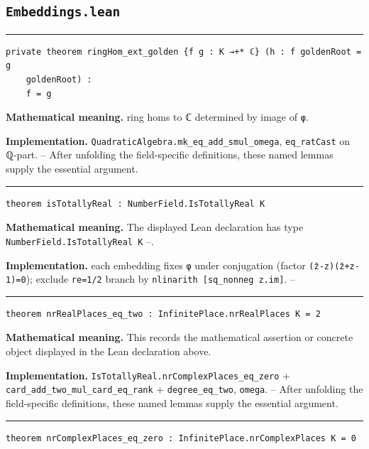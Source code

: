 \documentclass[UTF8,a4paper,11pt,fontset=fandol]{ctexart}
\theoremstyle{definition}
\newcommand{\statementsep}{\par\medskip\hrule\medskip}
\begin{document}
\subsection{\texttt{Embeddings.lean}}

\statementsep
\begin{verbatim}
private theorem ringHom_ext_golden {f g : K →+* ℂ} (h : f goldenRoot = g
    goldenRoot) :
    f = g
\end{verbatim}
\noindent\textbf{Mathematical meaning.} ring homs to ℂ determined by image of \texttt{φ}.\par
\noindent\textbf{Implementation.} \texttt{QuadraticAlgebra.\allowbreak{}mk\_\allowbreak{}eq\_\allowbreak{}add\_\allowbreak{}smul\_\allowbreak{}omega}, \texttt{eq\_\allowbreak{}ratCast} on ℚ-part. -- After unfolding the field-specific definitions, these named lemmas supply the essential argument.\par
\statementsep
\begin{verbatim}
theorem isTotallyReal : NumberField.IsTotallyReal K
\end{verbatim}
\noindent\textbf{Mathematical meaning.} The displayed Lean declaration has type \texttt{NumberField.\allowbreak{}IsTotallyReal K} --.\par
\noindent\textbf{Implementation.} each embedding fixes \texttt{φ} under conjugation (factor \texttt{(z̄-z)(z̄+z-1)=0}); exclude \texttt{re=1/\allowbreak{}2} branch by \texttt{nlinarith [sq\_\allowbreak{}nonneg z.\allowbreak{}im]}. --\par
\statementsep
\begin{verbatim}
theorem nrRealPlaces_eq_two : InfinitePlace.nrRealPlaces K = 2
\end{verbatim}
\noindent\textbf{Mathematical meaning.} This records the mathematical assertion or concrete object displayed in the Lean declaration above.\par
\noindent\textbf{Implementation.} \texttt{IsTotallyReal.\allowbreak{}nrComplexPlaces\_\allowbreak{}eq\_\allowbreak{}zero} + \texttt{card\_\allowbreak{}add\_\allowbreak{}two\_\allowbreak{}mul\_\allowbreak{}card\_\allowbreak{}eq\_\allowbreak{}rank} + \texttt{degree\_\allowbreak{}eq\_\allowbreak{}two}, \texttt{omega}. -- After unfolding the field-specific definitions, these named lemmas supply the essential argument.\par
\statementsep
\begin{verbatim}
theorem nrComplexPlaces_eq_zero : InfinitePlace.nrComplexPlaces K = 0
\end{verbatim}
\end{document}
